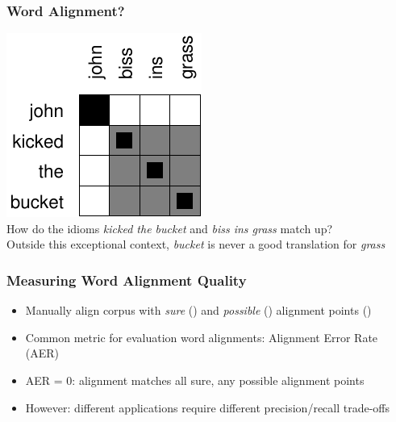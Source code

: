 \begin{frame}
\frametitle{Word Alignment?\koehnref}
\vspace{10mm}
\begin{center}
\includegraphics[scale=1.2]{figures/kicked-the-bucket-alignment.pdf}\\[5mm]
How do the idioms \textit{kicked the bucket} and \textit{biss ins grass} match up?\\ Outside this exceptional context, \textit{bucket} is never a good translation for \textit{grass}
\end{center}

\end{frame}


\begin{frame}
\frametitle{Measuring Word Alignment Quality\koehnref}
\vspace{10mm}
\begin{itemize}
\item Manually align corpus with {\em sure} () and {\em possible} () alignment points ()
\item Common metric for evaluation word alignments: Alignment Error Rate (AER)
\item AER = 0: alignment  matches all sure, any possible alignment points
\item However: different applications require different precision/recall trade-offs
\end{itemize}

\end{frame}


